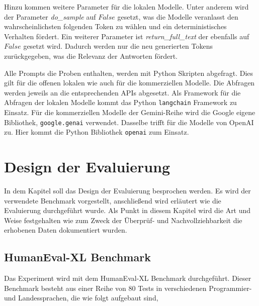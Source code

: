 Hinzu kommen weitere Parameter für die lokalen Modelle. Unter anderem wird der Parameter \textit{do\_sample} auf $False$ gesetzt, was die Modelle veranlasst den wahrscheinlichsten folgenden Token zu wählen und ein deterministisches Verhalten fördert. Ein weiterer Parameter ist \textit{return\_full\_text} der ebenfalls auf $False$ gesetzt wird. Dadurch werden nur die neu generierten Tokens zurückgegeben, was die Relevanz der Antworten fördert.\vspace{0.2cm}

Alle Prompts die Proben enthalten, werden mit Python Skripten abgefragt. Dies gilt für die offenen lokalen wie auch für die kommerziellen Modelle. Die Abfragen werden jeweils an die entsprechenden APIs abgesetzt. Als Framework für die Abfragen der lokalen Modelle kommt das Python \texttt{langchain} Framework zu Einsatz. Für die kommerziellen Modelle der Gemini-Reihe wird die Google eigene Bibliothek, \texttt{google.genai} verwendet. Dasselbe trifft für die Modelle von OpenAI zu. Hier kommt die Python Bibliothek \texttt{openai} zum Einsatz.



\section{Design der Evaluierung}
In dem Kapitel soll das Design der Evaluierung besprochen werden. Es wird der verwendete Benchmark vorgestellt, anschließend wird erläutert wie die Evaluierung durchgeführt wurde. Als Punkt in diesem Kapitel wird die Art und Weise festgehalten wie zum Zweck der Überprüf- und Nachvollziehbarkeit die erhobenen Daten dokumentiert wurden.

\subsection{HumanEval-XL Benchmark}\label{subsec:structor_of_humaneval_xl}
Das Experiment wird mit dem HumanEval-XL Benchmark durchgeführt. Dieser Benchmark besteht aus einer Reihe von 80 Tests in verschiedenen Programmier- und Landessprachen, die wie folgt aufgebaut sind,

